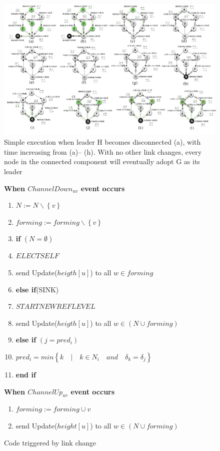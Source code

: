 \documentclass{article}
\begin{document}
\newpage
\begin{figure}[hbtp]
\centering
\includegraphics[scale=.5]{sample_execution.png}
\caption{Simple execution when leader H becomes disconnected (a), with time increasing from (a)–
(h). With no other link changes, every node in the connected component will eventually adopt G as
its leader}
\end{figure}

\newpage
\begin{figure}[hbtp]
\textbf{When $ChannelDown_{uv}$ event occurs}

\begin{enumerate}
\item \quad $ N := N\backslash \left\lbrace v\right\rbrace $
\item \quad $ forming := forming \backslash \left\lbrace v\right\rbrace $
\item \quad \textbf{if} $ (N = \emptyset )$
\item \quad \quad $ELECTSELF$
\item \quad \quad send Update($heigth[u]$) to all $ w\in forming$
\item \quad \textbf{else if}(SINK)
\item \quad \quad $STARTNEWREFLEVEL$
\item \quad \quad send Update($heigth[u]$) to all $w\in (N \cup forming)$
\item \quad \textbf{else if} $(j=pred_i)$
\item \quad \quad $pred_i=min \left\lbrace k \quad \vert \quad k\in N_i \quad and \quad \delta_k = \delta_j \right\rbrace$
\item \quad \textbf{end if}
\end{enumerate}


\textbf{When $ChannelUp_{uv}$ event occurs}

\begin{enumerate}
\item \quad $forming := forming \cup {v}$
\item \quad send Update($height[u]$) to all $ w \in (N \cup forming)$
\end{enumerate}
\caption{Code triggered by link change}
\end{figure}
\end{document}
